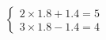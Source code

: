 \documentclass[preview]{standalone}
\begin{document}
\begin{align*}
\begin{cases} 2\times1.8 + 1.4 = 5 \\ 3\times1.8 - 1.4 = 4 \end{cases}
\end{align*}
\end{document}
